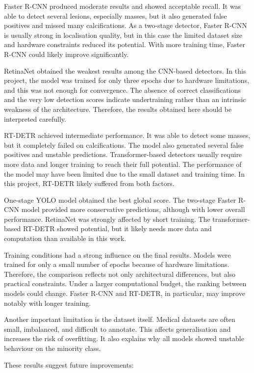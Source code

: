 \documentclass[12pt,a4paper]{article} %
\begin{document}
Faster R-CNN produced moderate results and showed acceptable recall. It was able to detect several lesions, especially masses, but it also generated false positives and missed many calcifications. As a two-stage detector, Faster R-CNN is usually strong in localisation quality, but in this case the limited dataset size and hardware constraints reduced its potential. With more training time, Faster R-CNN could likely improve significantly.

RetinaNet obtained the weakest results among the CNN-based detectors. In this project, the model was trained for only three epochs due to hardware limitations, and this was not enough for convergence. The absence of correct classifications and the very low detection scores indicate undertraining rather than an intrinsic weakness of the architecture. Therefore, the results obtained here should be interpreted carefully.

RT-DETR achieved intermediate performance. It was able to detect some masses, but it completely failed on calcifications. The model also generated several false positives and unstable predictions. Transformer-based detectors usually require more data and longer training to reach their full potential. The performance of the model may have been limited due to the small dataset and training time. In this project, RT-DETR likely suffered from both factors.

One-stage YOLO model obtained the best global score. The two-stage Faster R-CNN model provided more conservative predictions, although with lower overall performance. RetinaNet was strongly affected by short training. The transformer-based RT-DETR showed potential, but it likely needs more data and computation than available in this work.

Training conditions had a strong influence on the final results. Models were trained for only a small number of epochs because of hardware limitations. Therefore, the comparison reflects not only architectural differences, but also practical constraints. Under a larger computational budget, the ranking between models could change. Faster R-CNN and RT-DETR, in particular, may improve notably with longer training.

Another important limitation is the dataset itself. Medical datasets are often small, imbalanced, and difficult to annotate. This affects generalisation and increases the risk of overfitting. It also explains why all models showed unstable behaviour on the minority class.

These results suggest future improvements:
\end{document}
